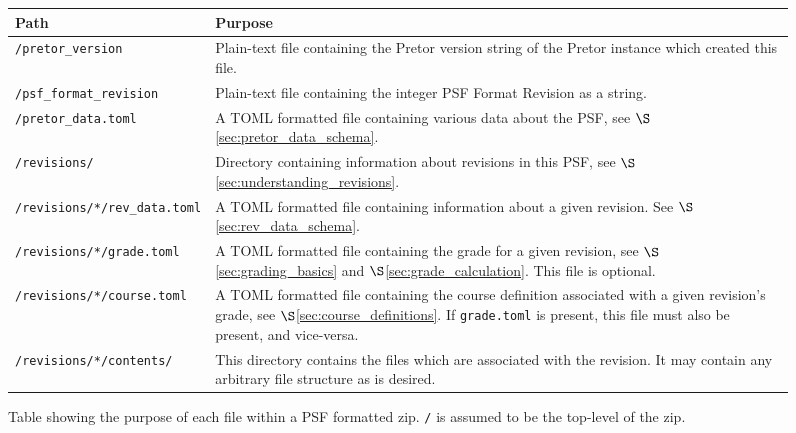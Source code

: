 \documentclass{book}
\begin{document}
\begin{figure}[H]

	\centering

	\begin{tabular}{l | p{}}

		Path & Purpose \\ \hline\hline

		\texttt{/pretor\_version} & Plain-text file containing the
		Pretor version string of the Pretor instance which created this
		file. \\ \hline

		\texttt{/psf\_format\_revision} & Plain-text file containing
		the integer PSF Format Revision as a string. \\ \hline

		\texttt{/pretor\_data.toml} & A TOML formatted file containing
		various data about the PSF, see
		$\S$\ref{sec:pretor_data_schema}. \\ \hline

		\texttt{/revisions/} & Directory containing information about
		revisions in this PSF, see
		$\S$\ref{sec:understanding_revisions}. \\ \hline

		\texttt{/revisions/*/rev\_data.toml} & A TOML formatted file
		containing information about a given revision. See
		$\S$\ref{sec:rev_data_schema}. \\ \hline

		\texttt{/revisions/*/grade.toml} & A TOML formatted file
		containing the grade for a given revision, see $\S$
		\ref{sec:grading_basics} and $\S$\ref{sec:grade_calculation}.
		This file is optional. \\ \hline

		\texttt{/revisions/*/course.toml} & A TOML formatted file
		containing the course definition associated with a given
		revision's grade, see $\S$\ref{sec:course_definitions}. If
		\texttt{grade.toml} is present, this file must also be present,
		and vice-versa. \\ \hline

		\texttt{/revisions/*/contents/} & This directory contains the
		files which are associated with the revision. It may contain
		any arbitrary file structure as is desired. \\ \hline

	\end{tabular}

	\caption{\label{fig:zipstruct} Table showing the purpose of each file
	within a PSF formatted zip. \texttt{/} is assumed to be the top-level
	of the zip.}

\end{figure}
\end{document}

